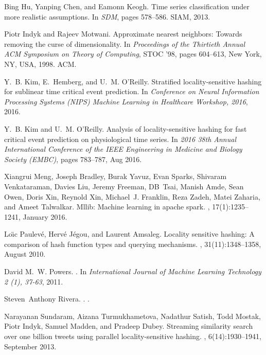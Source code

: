 \documentclass{article}
\begin{document}
\begin{thebibliography}{10}
Bing Hu, Yanping Chen, and Eamonn Keogh.
\newblock Time series classification under more realistic assumptions.
\newblock In {\em SDM}, pages 578--586. SIAM, 2013.

Piotr Indyk and Rajeev Motwani.
\newblock Approximate nearest neighbors: Towards removing the curse of
  dimensionality.
\newblock In {\em Proceedings of the Thirtieth Annual ACM Symposium on Theory
  of Computing}, STOC '98, pages 604--613, New York, NY, USA, 1998. ACM.

Y.~B. Kim, E.~Hemberg, and U.~M. O'Reilly.
\newblock Stratified locality-sensitive hashing for sublinear time critical
  event prediction.
\newblock In {\em Conference on Neural Information Processing Systems (NIPS)
  Machine Learning in Healthcare Workshop, 2016}, 2016.

Y.~B. Kim and U.~M. O'Reilly.
\newblock Analysis of locality-sensitive hashing for fast critical event
  prediction on physiological time series.
\newblock In {\em 2016 38th Annual International Conference of the IEEE
  Engineering in Medicine and Biology Society (EMBC)}, pages 783--787, Aug
  2016.

Xiangrui Meng, Joseph Bradley, Burak Yavuz, Evan Sparks, Shivaram Venkataraman,
  Davies Liu, Jeremy Freeman, DB~Tsai, Manish Amde, Sean Owen, Doris Xin,
  Reynold Xin, Michael~J. Franklin, Reza Zadeh, Matei Zaharia, and Ameet
  Talwalkar.
\newblock Mllib: Machine learning in apache spark.
, 17(1):1235--1241, January 2016.

Lo\"{\i}c Paulev{\'e}, Herv{\'e} J{\'e}gou, and Laurent Amsaleg.
\newblock Locality sensitive hashing: A comparison of hash function types and
  querying mechanisms.
, 31(11):1348--1358, August 2010.

David M.~W. Powers.
.
\newblock In {\em International Journal of Machine Learning Technology 2 (1),
  37-63}, 2011.

Steven~Anthony Rivera.
.
.

Narayanan Sundaram, Aizana Turmukhametova, Nadathur Satish, Todd Mostak, Piotr
  Indyk, Samuel Madden, and Pradeep Dubey.
\newblock Streaming similarity search over one billion tweets using parallel
  locality-sensitive hashing.
, 6(14):1930--1941, September 2013.


\end{thebibliography}
\end{document}
